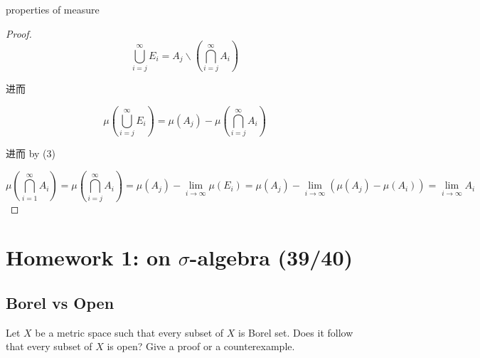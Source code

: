 \documentclass{qlnotes-export}
\begin{document}
\begin{theorem}{properties of measure}
\begin{enumerate}
\begin{proof}
  \[\bigcup\limits_{i = j}^{\infty}E_{i} = A_{j}\backslash(\bigcap\limits_{i = j}^{\infty}A_{i})\]

  进而

  \[\mu(\bigcup\limits_{i = j}^{\infty}E_{i}) = \mu(A_{j}) - \mu(\bigcap\limits_{i = j}^{\infty}A_{i})\]

  进而 by (3)

  \[\mu(\bigcap\limits_{i = 1}^{\infty}A_{i}) = \mu(\bigcap\limits_{i = j}^{\infty}A_{i}) = \mu(A_{j}) - \lim\limits_{i\rightarrow\infty}\mu(E_{i}) = \mu(A_{j}) - \lim\limits_{i\rightarrow\infty}(\mu(A_{j}) - \mu(A_{i})) = \lim\limits_{i\rightarrow\infty}A_{i}\]

  \end{proof}
\end{enumerate}

\end{theorem}

\chapter{\texorpdfstring{Homework 1: on \(\sigma\)-algebra (39/40)}{Homework 1: on \textbackslash sigma-algebra (39/40)}}\label{homework-1-on-sigma-algebra-3940}

\section{Borel vs Open}\label{borel-vs-open}

Let \(X\) be a metric space such that every subset of \(X\) is Borel set. Does it follow that every subset of \(X\) is open? Give a proof or a counterexample.
\end{document}
